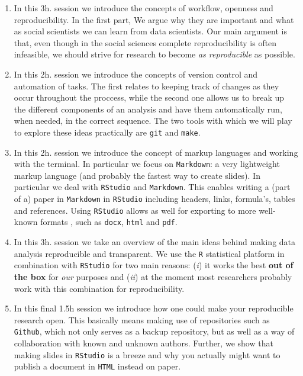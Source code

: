 \documentclass[11pt, a4paper]{article}
\begin{document}
\begin{enumerate}
\item In this 3h. session we introduce the concepts of workflow, openness and
    reproducibility. In the first part, We argue why they are important and
    what as social scientists we can learn from data scientists. Our main
    argument is that, even though in the social sciences complete
    reproducibility is often infeasible, we should strive for research to
    become \emph{as reproducible} as possible.
\item In this 2h. session we introduce the concepts of version control and
    automation of tasks. The first relates to keeping track of changes as they
    occur throughout the proccess, while the second one allows us to break up
    the different components of an analysis and have them automatically run,
    when needed, in the correct sequence. The two tools with which we will
    play to explore these ideas practically are \texttt{git} and
    \texttt{make}.
\item In this 2h. session we introduce the concept of markup languages and
    working with the terminal. In particular we focus on \texttt{Markdown}: a
    very lightweight markup language (and probably the fastest way to create
    slides). In particular we deal with \texttt{RStudio} and
    \texttt{Markdown}. This enables writing a (part of a) paper in
    \texttt{Markdown} in \texttt{RStudio} including headers, links, formula's,
    tables and references. Using \texttt{RStudio} allows as well for
    exporting to more well-known formats , such as \texttt{docx},
    \texttt{html} and \texttt{pdf}.
\item In this 3h. session we take an overview of the main ideas behind making
    data analysis reproducible and transparent. We use the \texttt{R}
    statistical platform in combination with \texttt{RStudio} for two main
    reasons: (\emph{i}) it works the best \textbf{out of the box} for
    \emph{our} purposes and (\emph{ii}) at the moment most researchers
    probably work with this combination for reproducibility.
\item In this final 1.5h session we introduce how one could make your
    reproducible research open. This basically means making use of
    repositories such as \texttt{Github}, which not only serves as a backup
    repository, but as well as a way of collaboration with known and unknown
    authors. Further, we show that making slides in \texttt{RStudio} is a
    breeze and why you actually might want to publish a document in
    \texttt{HTML} instead on paper.
\end{enumerate}
\end{document}
